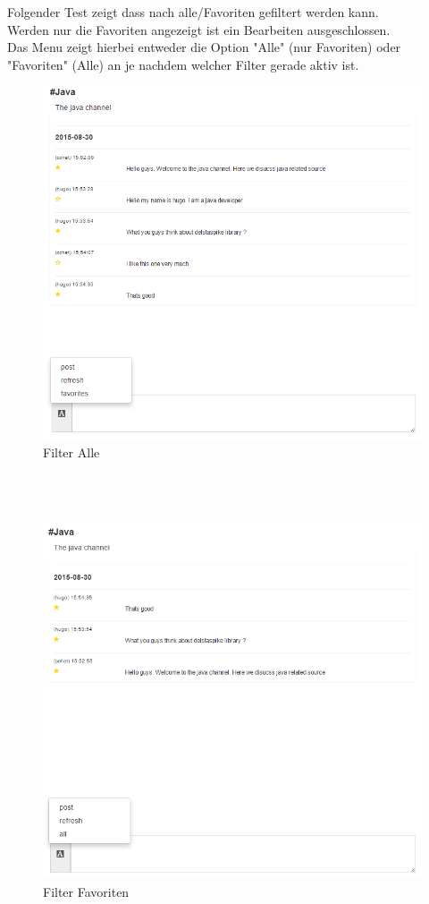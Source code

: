 \documentclass[11pt, a4paper, twoside]{article}   	%
\begin{document}
Folgender Test zeigt dass nach alle/Favoriten gefiltert werden kann.\\
Werden nur die Favoriten angezeigt ist ein Bearbeiten ausgeschlossen.\\
Das Menu zeigt hierbei entweder die Option "Alle" (nur Favoriten) oder "Favoriten" (Alle) an je nachdem welcher Filter gerade aktiv ist.
\begin{figure}[h]
	\centering
	\includegraphics[scale=0.4]{images/start_channel_chat_all.PNG}
	\caption
	{Filter Alle}
\end{figure}\\\\
\begin{figure}[h]
	\centering
	\includegraphics[scale=0.4]{images/start_channel_chat_favorites_only.PNG}
	\caption
	{Filter Favoriten}
\end{figure}\\\\
\newpage
\end{document}
